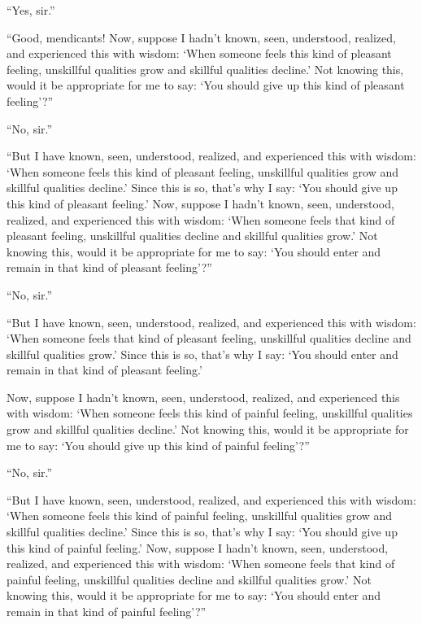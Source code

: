\documentclass[12pt,openany]{book}%
\begin{document}
“Yes, sir.” 

“Good, mendicants! Now, suppose I hadn’t known, seen, understood, realized, and experienced this with wisdom: ‘When someone feels this kind of pleasant feeling, unskillful qualities grow and skillful qualities decline.’ Not knowing this, would it be appropriate for me to say: ‘You should give up this kind of pleasant feeling’?” 

“No, sir.” 

“But I have known, seen, understood, realized, and experienced this with wisdom: ‘When someone feels this kind of pleasant feeling, unskillful qualities grow and skillful qualities decline.’ Since this is so, that’s why I say: ‘You should give up this kind of pleasant feeling.’ Now, suppose I hadn’t known, seen, understood, realized, and experienced this with wisdom: ‘When someone feels that kind of pleasant feeling, unskillful qualities decline and skillful qualities grow.’ Not knowing this, would it be appropriate for me to say: ‘You should enter and remain in that kind of pleasant feeling’?” 

“No, sir.” 

“But I have known, seen, understood, realized, and experienced this with wisdom: ‘When someone feels that kind of pleasant feeling, unskillful qualities decline and skillful qualities grow.’ Since this is so, that’s why I say: ‘You should enter and remain in that kind of pleasant feeling.’ 

Now, suppose I hadn’t known, seen, understood, realized, and experienced this with wisdom: ‘When someone feels this kind of painful feeling, unskillful qualities grow and skillful qualities decline.’ Not knowing this, would it be appropriate for me to say: ‘You should give up this kind of painful feeling’?” 

“No, sir.” 

“But I have known, seen, understood, realized, and experienced this with wisdom: ‘When someone feels this kind of painful feeling, unskillful qualities grow and skillful qualities decline.’ Since this is so, that’s why I say: ‘You should give up this kind of painful feeling.’ Now, suppose I hadn’t known, seen, understood, realized, and experienced this with wisdom: ‘When someone feels that kind of painful feeling, unskillful qualities decline and skillful qualities grow.’ Not knowing this, would it be appropriate for me to say: ‘You should enter and remain in that kind of painful feeling’?” 
\end{document}
